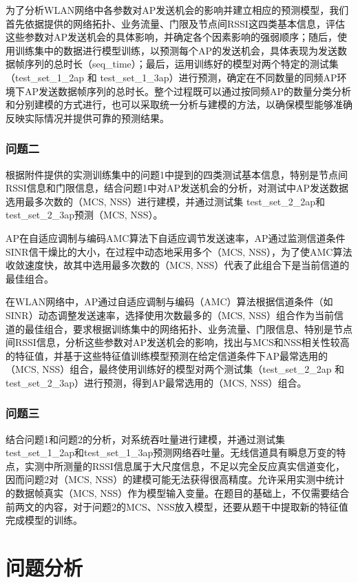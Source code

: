 \documentclass[bwprint]{gmcmthesis}
\begin{document}
为了分析WLAN网络中各参数对AP发送机会的影响并建立相应的预测模型，我们首先依据提供的网络拓扑、业务流量、门限及节点间RSSI这四类基本信息，评估这些参数对AP发送机会的具体影响，并确定各个因素影响的强弱顺序；随后，使用训练集中的数据进行模型训练，以预测每个AP的发送机会，具体表现为发送数据帧序列的总时长（seq\_time）；最后，运用训练好的模型对两个特定的测试集（test\_set\_1\_2ap 和 test\_set\_1\_3ap）进行预测，确定在不同数量的同频AP环境下AP发送数据帧序列的总时长。整个过程既可以通过按同频AP的数量分类分析和分别建模的方式进行，也可以采取统一分析与建模的方法，以确保模型能够准确反映实际情况并提供可靠的预测结果。

\subsubsection{问题二}
根据附件提供的实测训练集中的问题1中提到的四类测试基本信息，特别是节点间RSSI信息和门限信息，结合问题1中对AP发送机会的分析，对测试中AP发送数据选用最多次数的（MCS, NSS）进行建模，并通过测试集 test\_set\_2\_2ap和test\_set\_2\_3ap预测（MCS, NSS）。

AP在自适应调制与编码AMC算法下自适应调节发送速率，AP通过监测信道条件SINR信干燥比的大小，在过程中动态地采用多个（MCS, NSS），为了使AMC算法收敛速度快，故其中选用最多次数的（MCS, NSS）代表了此组合下是当前信道的最佳组合。

在WLAN网络中，AP通过自适应调制与编码（AMC）算法根据信道条件（如SINR）动态调整发送速率，选择使用次数最多的（MCS, NSS）组合作为当前信道的最佳组合，要求根据训练集中的网络拓扑、业务流量、门限信息、特别是节点间RSSI信息，分析这些参数对AP发送机会的影响，找出与MCS和NSS相关性较高的特征值，并基于这些特征值训练模型预测在给定信道条件下AP最常选用的（MCS, NSS）组合，最终使用训练好的模型对两个测试集（test\_set\_2\_2ap 和 test\_set\_2\_3ap）进行预测，得到AP最常选用的（MCS, NSS）组合。

\subsubsection{问题三}
结合问题1和问题2的分析，对系统吞吐量进行建模，并通过测试集test\_set\_1\_2ap和test\_set\_1\_3ap预测网络吞吐量。无线信道具有瞬息万变的特点，实测中所测量的RSSI信息属于大尺度信息，不足以完全反应真实信道变化，因而问题2对（MCS, NSS）的建模可能无法获得很高精度。允许采用实测中统计的数据帧真实（MCS, NSS）作为模型输入变量。在题目的基础上，不仅需要结合前两文的内容，对于问题2的MCS、NSS放入模型，还要从题干中提取新的特征值完成模型的训练。


\section{问题分析}
\end{document}
